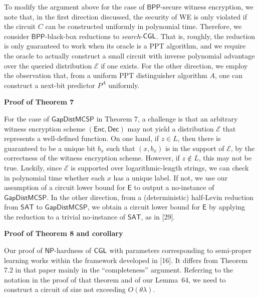 \documentclass[10pt,a4paper]{article}
\begin{document}
To modify the argument above for the case of ${\mathsf{BPP}}$-secure witness encryption, we note that, in the first direction discussed, the security of WE is only violated if the circuit $C$ can be constructed uniformly in polynomial time. Therefore, we consider ${\mathsf{BPP}}$-black-box reductions to \emph{search}-${\sf CGL}$. That is, roughly, the reduction is only guaranteed to work when its oracle is a PPT algorithm, and we require the oracle to actually construct a small circuit with inverse polynomial advantage over the queried distribution $\mathcal{E}$ if one exists. For the other direction, we employ the observation that, from a uniform PPT distinguisher algorithm $A$, one can construct a next-bit predictor $P^{A}$ uniformly.\par





\par\medskip\noindent\textbf{Proof of Theorem 7
}\par




For the case of ${\mathsf{GapDistMCSP}}$ in Theorem 7, a challenge is that an arbitrary witness encryption scheme $({\mathsf{Enc}},{\mathsf{Dec}})$ may not yield a distribution $\mathcal{E}$ that represents a well-defined function. On one hand, if $z\in L$, then there is guaranteed to be a unique bit $b_{x}$ such that $(x,b_{x})$ is in the support of $\mathcal{E}$, by the correctness of the witness encryption scheme. However, if $z\notin L$, this may not be true. Luckily, since $\mathcal{E}$ is supported over logarithmic-length strings, we can check in polynomial time whether each $x$ has a unique label. If not, we use our assumption of a circuit lower bound for ${\mathsf{E}}$ to output a no-instance of ${\mathsf{GapDistMCSP}}$. In the other direction, from a (deterministic) half-Levin reduction from ${\mathsf{SAT}}$ to ${\mathsf{GapDistMCSP}}$, we obtain a circuit lower bound for ${\mathsf{E}}$ by applying the reduction to a trivial no-instance of ${\mathsf{SAT}}$, as in [29].\par





\par\medskip\noindent\textbf{Proof of Theorem 8 and corollary}\par




Our proof of ${\mathsf{NP}}$-hardness of ${\sf CGL}$ with parameters corresponding to semi-proper learning works within the framework developed in [16]. It differs from Theorem 7.2 in that paper mainly in the “completeness” argument. Referring to the notation in the proof of that theorem and of our Lemma 64, we need to construct a circuit of size not exceeding $O(\theta\lambda)$.\par
\end{document}
